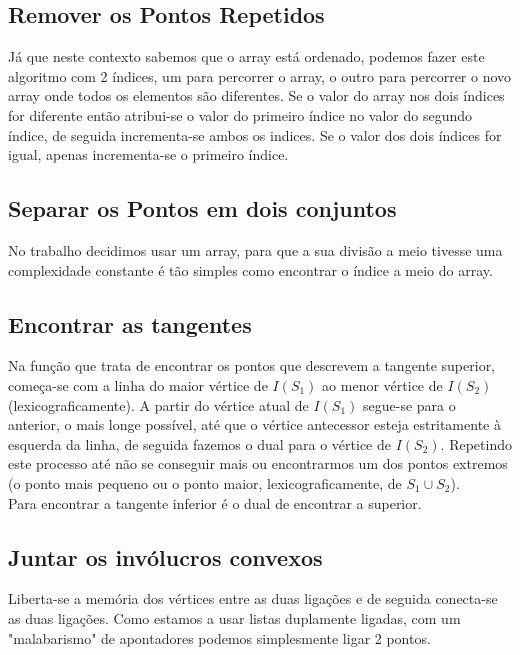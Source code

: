 \documentclass[11pt]{article}
\begin{document}
\subsection{ Remover os Pontos Repetidos }
Já que neste contexto sabemos que o array está ordenado,
podemos fazer este algoritmo com 2 índices, um para percorrer
o array, o outro para percorrer o novo array onde todos os 
elementos são diferentes. Se o valor do array nos dois índices for
diferente então atribui-se o valor do primeiro índice no valor 
do segundo índice, de seguida incrementa-se ambos os indices. 
Se o valor dos dois índices for igual, apenas incrementa-se o
primeiro índice.

\subsection{ Separar os Pontos em dois conjuntos }
No trabalho decidimos usar um array, para que a sua divisão a meio 
tivesse uma complexidade constante é tão simples como encontrar o 
índice a meio do array.

\subsection{ Encontrar as tangentes } \label{tangentes}
Na função que trata de encontrar os pontos que 
descrevem a tangente superior, começa-se com a linha
do maior vértice de $I(S_1)$ ao menor vértice de $I(S_2)$ (lexicograficamente).
A partir do vértice atual de $I(S_1)$ segue-se para o anterior, o mais 
longe possível, até que o vértice antecessor esteja estritamente à
esquerda da linha, de seguida fazemos o dual para o vértice de $I(S_2)$.
Repetindo este processo até não se conseguir mais ou encontrarmos
um dos pontos extremos (o ponto mais pequeno ou o ponto maior,
lexicograficamente, de $S_1 \cup S_2$).\\

Para encontrar a tangente inferior é o dual de encontrar
a superior.

\subsection{ Juntar os invólucros convexos } 
Liberta-se a memória dos vértices entre as duas ligações e de seguida 
conecta-se as duas ligações. Como estamos a usar listas duplamente
ligadas, com um "malabarismo" de apontadores podemos simplesmente
ligar 2 pontos.

\end{document}
